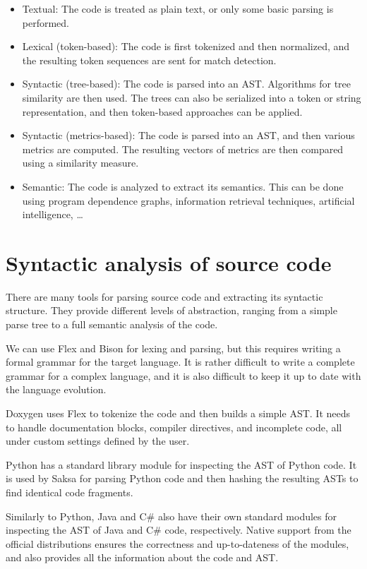 \begin{itemize}
\item Textual: The code is treated as plain text, or only some basic parsing is performed.
\item Lexical (token-based): The code is first tokenized and then normalized, and the resulting token sequences are sent for match detection.
\item Syntactic (tree-based): The code is parsed into an AST. Algorithms for tree similarity are then used. The trees can also be serialized into a token or string representation, and then token-based approaches can be applied.
\item Syntactic (metrics-based): The code is parsed into an AST, and then various metrics are computed. The resulting vectors of metrics are then compared using a similarity measure.
\item Semantic: The code is analyzed to extract its semantics. This can be done using program dependence graphs, information retrieval techniques, artificial intelligence, \dots
\end{itemize}

\section{Syntactic analysis of source code}

There are many tools for parsing source code and extracting its syntactic structure.
They provide different levels of abstraction, ranging from a simple parse tree to a full semantic analysis of the code.

We can use Flex \cite{flex} and Bison \cite{bison} for lexing and parsing, but this requires writing a formal grammar for the target language.
It is rather difficult to write a complete grammar for a complex language, and it is also difficult to keep it up to date with the language evolution.

Doxygen \cite{doxygenparser} uses Flex to tokenize the code and then builds a simple AST.
It needs to handle documentation blocks, compiler directives, and incomplete code, all under custom settings defined by the user.

Python has a standard library module \cite{pythonast} for inspecting the AST of Python code.
It is used by Saksa \cite{saksa20} for parsing Python code and then hashing the resulting ASTs to find identical code fragments.

Similarly to Python, Java and C\# also have their own standard modules for inspecting the AST of Java \cite{javaast} and C\# \cite{csharpast} code, respectively.
Native support from the official distributions ensures the correctness and up-to-dateness of the modules, and also provides all the information about the code and AST.

